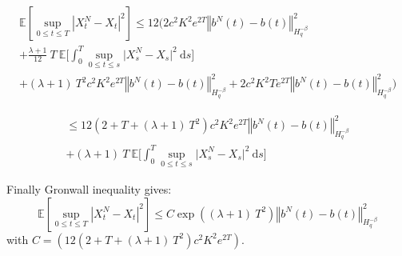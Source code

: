 \documentclass{article}[12pt]
\newcommand{\norme}[1]{\left\Vert #1\right\Vert}
\newcommand{\E}{\mathbb{E}}
\newcommand{\di}{\mathrm{d}}
\begin{document}
        \begin{multline*}
        \E\left[\underset{0\leq t\leq T}{\sup}\left|X^{N}_t-X_t\right|^2\right]
        \leq 12\Bigg(2c^2K^2e^{2T}\norme{b^N(t)-b(t)}_{H^{-\beta}_{q}}^2\\ + \frac{\lambda+1}{12}\ T\ \E\bigg[\int_0^T \underset{0\leq t\leq s}{\sup}\big|X_s^N- X_s\big|^2\ \di s\bigg]\\ + (\lambda+1)\ T^2 c^2K^2e^{2T}\norme{b^N(t)-b(t)}_{H^{-\beta}_{q}}^2 +2c^2K^2Te^{2T}\norme{b^N(t)-b(t)}_{H^{-\beta}_{q}}^2 \Bigg)
        \end{multline*}
        
        \begin{multline*}
        \leq 12\left(2 + T + (\lambda+1)\ T^2\right) c^2K^2e^{2T}\norme{b^N(t)-b(t)}_{H^{-\beta}_{q}}^2\\  +
        (\lambda+1)\ T\ \E\bigg[\int_0^T \underset{0\leq t\leq s}{\sup}\big|X_s^N- X_s\big|^2\ \di s\bigg]
        \end{multline*}
        
        Finally Gronwall inequality gives:
        \begin{equation}
        \E\left[\underset{0\leq t\leq T}{\sup}\left|X^{N}_t-X_t\right|^2\right]
        \leq 
        C\exp\left((\lambda+1)\ T^2\right)\norme{b^N(t)-b(t)}_{H^{-\beta}_{q}}^2        
        \end{equation}
        with $C=\left(12\left(2 + T + (\lambda+1)\ T^2\right) c^2K^2e^{2T}\right)$.
       


    
\end{document}
